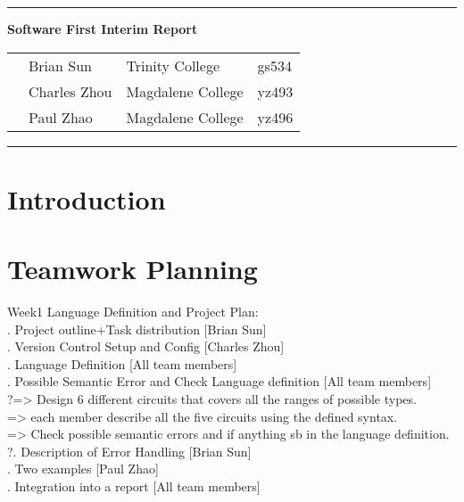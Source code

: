 \documentclass[12pt]{article}
\def\n{\noindent}
\begin{document}
\vspace{0.3cm}
\rule{15.7cm}{0.5mm}


\begin{center}
{\hspace{0.6cm}\Large \textbf {Software First Interim Report}\\
}
\end{center}
\begin{table}[H]
\centering
\begin{tabular}{ p{1.5cm}p{5cm}p{6cm} p{6cm}} 
&Brian Sun & Trinity College & gs534 \\ 
&Charles Zhou & Magdalene College & yz493 \\ 
&Paul Zhao & Magdalene College & yz496 \\ 
\end{tabular}
\end{table}


\begin{center}
\rule{15.7cm}{0.5mm}
\end{center}

\section{Introduction}
\section{Teamwork Planning}
\n Week1 Language Definition and Project Plan:\\
\n 1. Project outline+Task distribution	[Brian Sun]\\
\n 2. Version Control Setup and Config		[Charles Zhou]\\
\n 3. Language Definition 					[All team members]\\
\n 4. Possible Semantic Error and Check Language definition 	[All team members]\\?\n => Design 6 different circuits that covers all the ranges of possible types.\\
\n => each member describe all the five circuits using the defined syntax.\\
\n => Check possible semantic errors and if anything sb in the language definition.\\?\n 5. Description of Error Handling		[Brian Sun]\\
\n 6. Two examples					[Paul Zhao]\\
\n 7. Integration into a report			[All team members]\par
\end{document}
